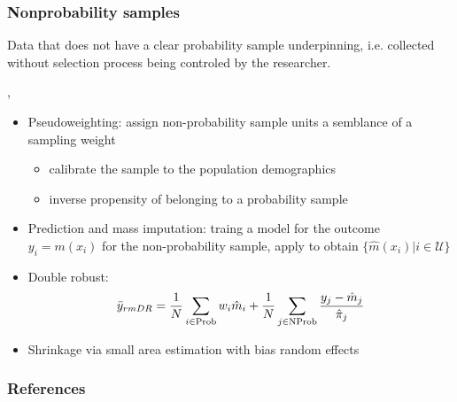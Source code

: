 \documentclass[aspectratio=43]{beamer}
\begin{document}
\begin{frame}\frametitle{Nonprobability samples}

Data that does not have a clear probability sample underpinning,
i.e. collected without selection process being controled by the researcher.

\citet{rao:2021:nonprob}, \citet{wu:2022:nonprob}

\begin{itemize}
	\item Pseudoweighting: assign non-probability sample units a semblance
	      of a sampling weight
	      \begin{itemize}
	      	\item calibrate the sample to the population demographics
	      	\item inverse propensity of belonging to a probability sample
		  \end{itemize}
    \item Prediction and mass imputation: traing a model for the outcome
          $y_i=m(x_i)$ for the non-probability sample, apply to obtain
          $\{ \hat m(x_i) | i \in \mathcal{U}\}$
    \item Double robust: 
$$
	\bar y_{rm DR} = \frac1N \sum_{i \in {\rm Prob}} w_i \hat m_i + 
					 \frac1N \sum_{j \in {\rm NProb}} \frac{y_j-\hat m_j}{\hat \pi_j}    
$$
	\item Shrinkage via small area estimation with bias random effects
	      \citep{ganesh:2017:truenorth}
    
\end{itemize}
	
\end{frame}

\begin{frame}[allowframebreaks]\frametitle{References}




\end{frame}
\end{document}
